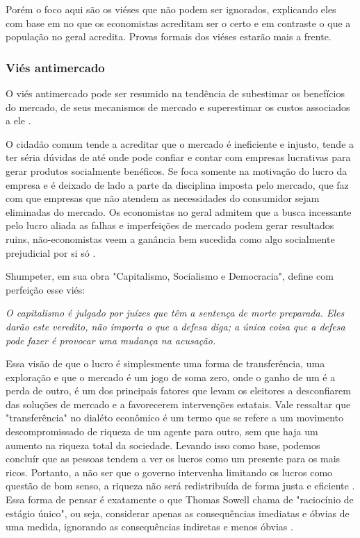 Porém o foco aqui são os viéses que não podem ser ignorados, explicando eles com base em no que os economistas acreditam ser o certo e em contraste o que a população no geral acredita. Provas formais dos viéses estarão mais a frente.


\subsubsection{Viés antimercado}

O viés antimercado pode ser resumido na tendência de subestimar os benefícios do mercado, de seus mecanismos de mercado e superestimar os custos associados a ele \cite{sowell2000basic,sowell2004applied,The_Myth_of_the_Rational_Voter}. 

O cidadão comum tende a acreditar que o mercado é ineficiente e injusto, tende a ter séria dúvidas de até onde pode confiar e contar com empresas lucrativas para gerar produtos socialmente benéficos. Se foca somente na motivação do lucro da empresa e é deixado de lado a parte da disciplina imposta pelo mercado, que faz com que empresas que não atendem as necessidades do consumidor sejam eliminadas do mercado. Os economistas no geral admitem que a busca incessante pelo lucro aliada as falhas e imperfeições de mercado podem gerar resultados ruins, não-economistas veem a ganância bem sucedida como algo socialmente prejudicial por si só \cite{The_Myth_of_the_Rational_Voter}.

Shumpeter, em sua obra "Capitalismo, Socialismo e Democracia", define com perfeição esse viés:

\begin{citacao}
    \textit{O capitalismo é julgado por juízes que têm a sentença de morte preparada. Eles darão este veredito, não importa o que a defesa diga; a única coisa que a defesa pode fazer é provocar uma mudança na acusação. \newline
    }  \cite{schumpeter1976capitalism}
\end{citacao}

Essa visão de que o lucro é simplesmente uma forma de transferência, uma exploração e que o mercado é um jogo de soma zero, onde o ganho de um é a perda de outro, é um dos principais fatores que levam os eleitores a desconfiarem das soluções de mercado e a favorecerem intervenções estatais. Vale ressaltar que "transferência" no dialéto econômico é um termo que se refere a um movimento descompromissado de riqueza de um agente para outro, sem que haja um aumento na riqueza total da sociedade. Levando isso como base, podemos concluír que as pessoas tendem a ver os lucros como um presente para os mais ricos. Portanto, a não ser que o governo intervenha limitando os lucros como questão de bom senso, a riqueza não será redistribuída de forma justa e eficiente \cite{The_Myth_of_the_Rational_Voter}. Essa forma de pensar é exatamente o que Thomas Sowell chama de "raciocínio de estágio único", ou seja, considerar apenas as consequências imediatas e óbvias de uma medida, ignorando as consequências indiretas e menos óbvias \cite{sowell2004applied}.

